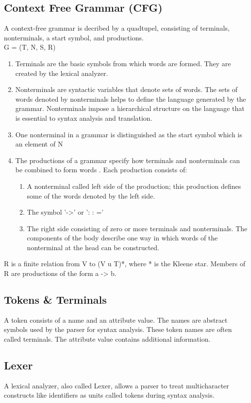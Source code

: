 \subsection{Context Free Grammar (CFG)}
A context-free grammar is decribed by a quadtupel, consisting of terminals, nonterminals, a start symbol, and productions. \\
G = (T, N, S, R)\\
\begin{enumerate}
	\item Terminals are the basic symbols from which words are formed.  They are created by the lexical analyzer.
	\item Nonterminals are syntactic variables that denote sets of words. The sets of words denoted by nonterminals helps to define the language generated by the grammar. Nonterminals impose a hierarchical structure on the language that is essential to syntax analysis and translation.
	\item One nonterminal in a grammar is distinguished as the start symbol which is an element of N
	\item The productions of a grammar specify how terminals and nonterminals can be combined to form words . Each production consists of:
	\begin{enumerate}
		\item A nonterminal called left side of the production; this production defines some of the words denoted by the left side.
		\item The symbol '->'  or  ': : =' 
		\item The right side consisting of zero or more terminals and nonterminals. The components of the body describe one way in which words of the nonterminal at the head can be constructed.
	\end{enumerate}
\end{enumerate}
 R is a finite relation from V to (V u T)*, where * is the Kleene star. Members of R are productions of the form a -> b.\cite{DragonBook}


\subsection{Tokens \& Terminals}  
A token consists of a name and an attribute value. The names are abstract symbols used by the parser for syntax analysis. These token names are often called terminals. The attribute value contains additional information.\cite{DragonBook}


\subsection{Lexer}
A lexical analyzer, also called Lexer, allows a parser to treat multicharacter constructs like identifiers as units called tokens during syntax analysis.\cite{DragonBook}

